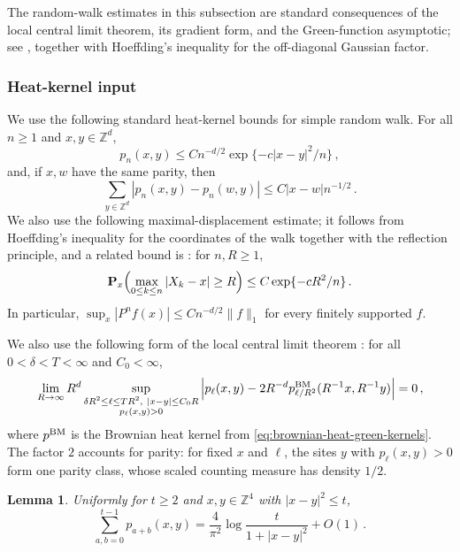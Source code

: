 \documentclass[11pt]{amsart}
\theoremstyle{plain}
\newtheorem{lemma}[theorem]{Lemma}
\theoremstyle{definition}
\newcommand{\Z}{\mathbb{Z}}
\begin{document}
	The random-walk estimates in this subsection are standard consequences of
	the local central limit theorem, its gradient form, and the Green-function
	asymptotic; see \citet[Propositions~2.4.1, 2.4.4, and~2.4.6, and
	Theorem~4.3.1]{LawlerLimic}, together with Hoeffding's inequality for the
	off-diagonal Gaussian factor. 

	\subsubsection{Heat-kernel input}

	We use the following standard heat-kernel bounds for simple random walk. For
	all $n\geq1$ and $x,y\in\Z^d$,
	\begin{equation}\label{eq:rw-gaussian-upper}
		p_n(x,y)\leq Cn^{-d/2}\exp\{-c|x-y|^2/n\}\, ,
	\end{equation}
	and, if $x,w$ have the same parity, then
	\begin{equation}\label{eq:rw-tv-gradient}
		\sum_{y\in\Z^d}|p_n(x,y)-p_n(w,y)|
		\leq C|x-w| n^{-1/2}\, .
	\end{equation}
	We also use the following maximal-displacement estimate; it follows from
	Hoeffding's inequality for the coordinates of the walk together with the
	reflection principle, and a related bound is \citet[Lemma~1.5.1]{LawlerInt}: for $n,R\geq1$,
	\begin{equation}\label{eq:rw-max-displacement}
		\mathbf P_x\Bigl(\max_{0\leq k\leq n}|X_k-x|\geq R\Bigr)
		\leq C\exp\{-cR^2/n\}\, .
	\end{equation}
	In particular, $\sup_x|P^nf(x)|\leq Cn^{-d/2}\|f\|_1$ for every finitely
	supported $f$.

	We also use the following form of the local central limit theorem
	\citep[Theorem~2.1.3, Eq.~(2.8)]{LawlerLimic}: for all
	$0<\delta<T<\infty$ and $C_0<\infty$,
	\begin{equation}\label{eq:lclt-parity}
		\lim_{R\to\infty}R^d
		\sup_{\substack{
		\delta R^2\leq\ell\leq TR^2,\ |x-y|\leq C_0R\\
		p_\ell(x,y)>0}}
		\left|
		p_\ell(x,y)
		-2R^{-d}p^{\rm BM}_{\ell/R^2}(R^{-1}x,R^{-1}y)
		\right|=0\, ,
	\end{equation}
	where $p^{\rm BM}$ is the Brownian heat kernel from
	\eqref{eq:brownian-heat-green-kernels}. The factor $2$ accounts for
	parity: for fixed $x$ and $\ell$, the sites $y$ with $p_\ell(x,y)>0$ form
	one parity class, whose scaled counting measure has density $1/2$.

\begin{lemma}\label{lem:d4-double-heat-kernel}
	Uniformly for $t\geq2$ and $x,y\in\Z^4$ with $|x-y|^2\leq t$,
		\[
			\sum_{a,b=0}^{t-1}p_{a+b}(x,y) = \frac4{\pi^2}\log\frac{t}{1+|x-y|^2}+O(1)\, .
		\]
\end{lemma}
\end{document}
